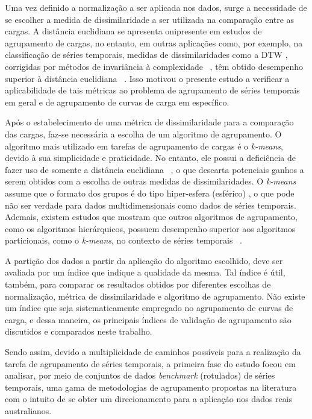 Uma vez definido a normalização a ser aplicada nos dados, surge a necessidade de se escolher a medida de dissimilaridade a ser utilizada na comparação entre as cargas. A distância euclidiana se apresenta onipresente em estudos de agrupamento de cargas, no entanto, em outras aplicações como, por exemplo, na classificação de séries temporais, medidas de dissimilaridades como a DTW \parencite{DTW}, corrigidas por métodos de invariância à complexidade ~\parencite{CID}, têm obtido desempenho superior à distância euclidiana ~\parencite{BatistaComparativo}. Isso motivou o presente estudo a verificar a aplicabilidade de tais métricas ao problema de agrupamento de séries temporais em geral e de agrupamento de curvas de carga em específico.

Após o estabelecimento de uma métrica de dissimilaridade para a comparação das cargas, faz-se necessária a escolha de um algoritmo de agrupamento. O algoritmo mais utilizado em tarefas de agrupamento de cargas é o \emph{k-means}, devido à sua simplicidade e praticidade. No entanto, ele possui a deficiência de fazer uso de somente a distância euclidiana ~\parencite[][254]{Ullman}, o que descarta potenciais ganhos a serem obtidos com a escolha de outras medidas de dissimilaridades. O \emph{k-means} assume que o formato dos grupos é do tipo hiper-esfera (esférico) , o que pode não ser verdade para dados multidimensionais como dados de séries temporais. Ademais, existem estudos que mostram que outros algoritmos de agrupamento, como os algoritmos hierárquicos, possuem desempenho superior aos algoritmos particionais, como o \emph{k-means}, no contexto de séries temporais ~\parencite{k_shape}.

A partição dos dados a partir da aplicação do algoritmo escolhido, deve ser avaliada por um índice que indique a qualidade da mesma. Tal índice é útil, também, para comparar os resultados obtidos por diferentes escolhas de normalização, métrica de dissimilaridade e algoritmo de agrupamento. Não existe um índice que seja sistematicamente empregado no agrupamento de curvas de carga, e dessa maneira, os principais índices de validação de agrupamento são discutidos e comparados neste trabalho.

Sendo assim, devido a multiplicidade de caminhos possíveis para a realização da tarefa de agrupamento de séries temporais, a primeira fase do estudo focou em analisar, por meio de conjuntos de dados \emph{benchmark} (rotulados) de séries temporais, uma gama de metodologias de agrupamento propostas na literatura com o intuito de se obter um direcionamento para a aplicação nos dados reais australianos.

